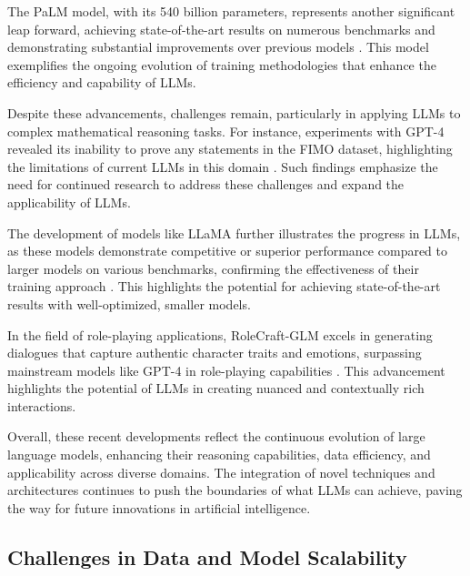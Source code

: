 The PaLM model, with its 540 billion parameters, represents another significant leap forward, achieving state-of-the-art results on numerous benchmarks and demonstrating substantial improvements over previous models \cite{chowdhery2023palm}. This model exemplifies the ongoing evolution of training methodologies that enhance the efficiency and capability of LLMs.



Despite these advancements, challenges remain, particularly in applying LLMs to complex mathematical reasoning tasks. For instance, experiments with GPT-4 revealed its inability to prove any statements in the FIMO dataset, highlighting the limitations of current LLMs in this domain \cite{liu2023fimochallengeformaldataset}. Such findings emphasize the need for continued research to address these challenges and expand the applicability of LLMs.



The development of models like LLaMA further illustrates the progress in LLMs, as these models demonstrate competitive or superior performance compared to larger models on various benchmarks, confirming the effectiveness of their training approach \cite{touvron2023llama}. This highlights the potential for achieving state-of-the-art results with well-optimized, smaller models.



In the field of role-playing applications, RoleCraft-GLM excels in generating dialogues that capture authentic character traits and emotions, surpassing mainstream models like GPT-4 in role-playing capabilities \cite{tao2024rolecraftglmadvancingpersonalizedroleplaying}. This advancement highlights the potential of LLMs in creating nuanced and contextually rich interactions.



Overall, these recent developments reflect the continuous evolution of large language models, enhancing their reasoning capabilities, data efficiency, and applicability across diverse domains. The integration of novel techniques and architectures continues to push the boundaries of what LLMs can achieve, paving the way for future innovations in artificial intelligence.



\subsection{Challenges in Data and Model Scalability} \label{subsec:Challenges in Data and Model Scalability}



